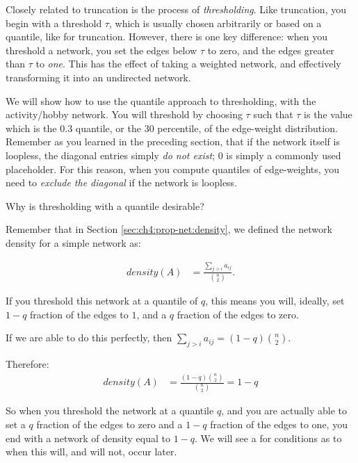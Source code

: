Closely related to truncation is the process of \emph{thresholding}. Like truncation, you begin with a threshold $\tau$, which is usually chosen arbitrarily or based on a quantile, like for truncation. However, there is one key difference: when you threshold a network, you set the edges below $\tau$ to zero, and the edges greater than $\tau$ to \emph{one}. This has the effect of taking a weighted network, and effectively transforming it into an undirected network. 

We will show how to use the quantile approach to thresholding, with the activity/hobby network. You will threshold by choosing $\tau$ such that $\tau$ is the value which is the $0.3$ quantile, or the $30$ percentile, of the edge-weight distribution. Remember as you learned in the preceding section, that if the network itself is loopless, the diagonal entries simply \emph{do not exist}; $0$ is simply a commonly used placeholder. For this reason, when you compute quantiles of edge-weights, you need to \emph{exclude the diagonal} if the network is loopless. 

\begin{floatingbox}[h]\caption{Why is thresholding with a quantile desirable?}\label{box:ch4:desirable}
Remember that in Section \ref{sec:ch4:prop-net:density}, we defined the network density for a simple network as:

\begin{align*}
    density(A) &= \frac{\sum_{j > i}a_{ij}}{\binom{n}{2}}.
\end{align*}

If you threshold this network at a quantile of $q$, this means you will, ideally, set $1 - q$ fraction of the edges to $1$, and a $q$ fraction of the edges to zero.

If we are able to do this perfectly, then $\sum_{j > i}a_{ij} = (1 - q)\binom n 2$.

Therefore:
\begin{align*}
    density(A) &= \frac{(1 - q)\binom n 2}{\binom n 2} = 1 - q
\end{align*}

So when you threshold the network at a quantile $q$, and you are {actually} able to set a $q$ fraction of the edges to zero and a $1 - q$ fraction of the edges to one, you end with a network of density equal to $1 - q$. We will see a for conditions as to when this will, and will not, occur later.
\end{floatingbox}

